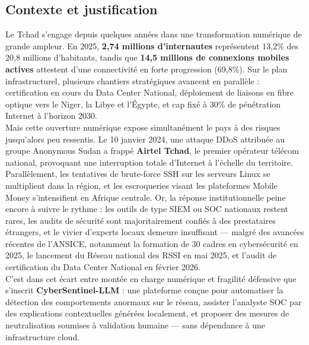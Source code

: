 \documentclass[12pt,a4paper]{report}
\begin{document}
\subsection*{Contexte et justification}
\begin{onehalfspace}
Le Tchad s'engage depuis quelques années dans une transformation numérique
de grande ampleur. En 2025, \textbf{2,74 millions d'internautes} représentent
13,2\% des 20,8 millions d'habitants, tandis que \textbf{14,5 millions de
connexions mobiles actives} attestent d'une connectivité en forte progression
(69,8\%). Sur le plan infrastructurel, plusieurs chantiers stratégiques
avancent en parallèle : certification en cours du Data Center National,
déploiement de liaisons en fibre optique vers le Niger, la Libye et l'Égypte,
et cap fixé à 30\% de pénétration Internet à l'horizon 2030.\\

Mais cette ouverture numérique expose simultanément le pays à des risques
jusqu'alors peu ressentis. Le 10 janvier 2024, une attaque DDoS attribuée au
groupe Anonymous Sudan a frappé \textbf{Airtel Tchad}, le premier opérateur
télécom national, provoquant une interruption totale d'Internet à l'échelle
du territoire. Parallèlement, les tentatives de brute-force SSH sur les
serveurs Linux se multiplient dans la région, et les escroqueries visant les
plateformes Mobile Money s'intensifient en Afrique centrale. Or, la réponse
institutionnelle peine encore à suivre le rythme : les outils de type SIEM ou
SOC nationaux restent rares, les audits de sécurité sont majoritairement
confiés à des prestataires étrangers, et le vivier d'experts locaux demeure
insuffisant — malgré des avancées récentes de l'ANSICE, notamment la formation
de 30 cadres en cybersécurité en 2025, le lancement du Réseau national des
RSSI en mai 2025, et l'audit de certification du Data Center National en
février 2026.\\

C'est dans cet écart entre montée en charge numérique et fragilité défensive
que s'inscrit \textbf{CyberSentinel-LLM} : une plateforme conçue pour
automatiser la détection des comportements anormaux sur le réseau, assister
l'analyste SOC par des explications contextuelles générées localement, et
proposer des mesures de neutralisation soumises à validation humaine — sans
dépendance à une infrastructure cloud.
\end{onehalfspace}
\end{document}

